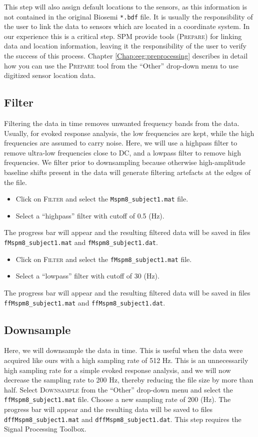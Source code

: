 This step will also assign default locations to the sensors, as this information is not contained in the original Biosemi \texttt{*.bdf} file. It is usually the responsibility of the user to link the data to sensors which are located in a coordinate system. In our experience this is a critical step. SPM provide tools (\textsc{Prepare}) for linking data and location information, leaving it the responsibility of the user to verify the success of this process. Chapter \ref{Chap:eeg:preprocessing} describes in detail how you can use the \textsc{Prepare} tool from the ``Other'' drop-down menu to use digitized sensor location data.


\subsection{Filter}
Filtering the data in time removes unwanted frequency bands from the data. Usually, for evoked response analysis, the low frequencies are kept, while the high frequencies are assumed to carry noise. Here, we will use a highpass filter to remove ultra-low frequencies close to DC, and a lowpass filter to remove high frequencies. We filter prior to downsampling because otherwise high-amplitude baseline shifts present in the data will generate filtering artefacts at the edges of the file. 
\begin{itemize}
\item{Click on \textsc{Filter} and select the \texttt{Mspm8\_subject1.mat} file.}
\item{Select a ``highpass'' filter with cutoff of 0.5 (Hz).}
\end{itemize}
The progress bar will appear and the resulting filtered data will be saved in files \texttt{fMspm8\_subject1.mat} and \texttt{fMspm8\_subject1.dat}. 
\begin{itemize}
\item{Click on \textsc{Filter} and select the \texttt{fMspm8\_subject1.mat} file.}
\item{Select a ``lowpass'' filter with cutoff of 30 (Hz).}
\end{itemize}
The progress bar will appear and the resulting filtered data will be saved in files \texttt{ffMspm8\_subject1.mat} and \texttt{ffMspm8\_subject1.dat}. 

\subsection{Downsample}
Here, we will downsample the data in time. This is useful when the data were acquired like ours with a high sampling rate of 512 Hz. This is an unnecessarily high sampling rate for a simple evoked response analysis, and we will now decrease the sampling rate to 200 Hz, thereby reducing the file size by more than half. Select \textsc{Downsample} from the ``Other'' drop-down menu and select the \texttt{ffMspm8\_subject1.mat} file. Choose a new sampling rate of 200 (Hz). The progress bar will appear and the resulting data will be saved to files \texttt{dffMspm8\_subject1.mat} and \texttt{dffMspm8\_subject1.dat}. This step requires the Signal Processing Toolbox.

